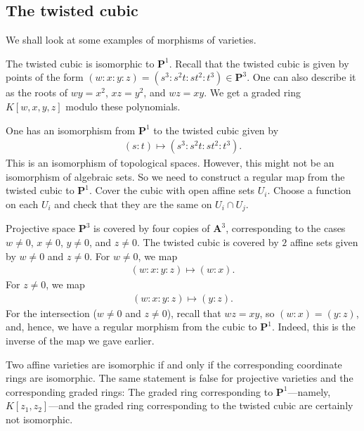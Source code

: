 \documentclass [11 pt, oneside] {article}
\begin{document}
\subsection{The twisted cubic}
We shall look at some examples of morphisms of varieties.

\begin{example}\label{}
The twisted cubic is isomorphic to $\mathbf{P}^1$. Recall that the twisted cubic is given by points of the form $(w:x:y:z) = (s^3:s^2t:st^2:t^3)\in  \mathbf{P}^3$. One can also describe it as the roots of $wy=x^2$, $xz=y^2$, and $wz=xy$. We get a graded ring $K[w,x,y,z]$ modulo these polynomials.

One has an isomorphism from $\mathbf{P}^1$ to the twisted cubic given by 
\begin{align*}
	(s:t) \longmapsto  (s^3:s^2t:st^2:t^3).
\end{align*}
This is an isomorphism of topological spaces. However, this might not be an isomorphism of algebraic sets. So we need to construct a regular map from the twisted cubic to $\mathbf{P}^1$. Cover the cubic with open affine sets $U_i$. Choose a function on each $U_i$ and check that they are the same on $U_i\cap U_j$.

Projective space $\mathbf{P}^3$ is covered by four copies of $\mathbf{A}^3$, corresponding to the cases $w\ne 0$, $x\ne 0$, $y\ne 0$, and $z\ne 0$. The twisted cubic is covered by $2$ affine sets given by $w\ne 0$ and $z\ne 0$. For $w\ne 0$, we map
\begin{align*}
	(w:x:y:z)\longmapsto  (w:x).
\end{align*}
For $z\ne 0$, we map
\begin{align*}
	(w:x:y:z)\longmapsto  (y:z).
\end{align*}
For the intersection ($w\ne 0$ and $z\ne 0$), recall that $wz=xy$, so $(w:x)= (y:z)$, and, hence, we have a regular morphism from the cubic to $\mathbf{P}^1$. Indeed, this is the inverse of the map we gave earlier.
\end{example}

\begin{remark}
	Two affine varieties are isomorphic if and only if the corresponding coordinate rings are isomorphic. The same statement is false for projective varieties and the corresponding graded rings: The graded ring corresponding to $\mathbf{P}^1$---namely, $K[z_1,z_2]$---and the graded ring corresponding to the twisted cubic are certainly not isomorphic.
\end{remark}
\end{document}
